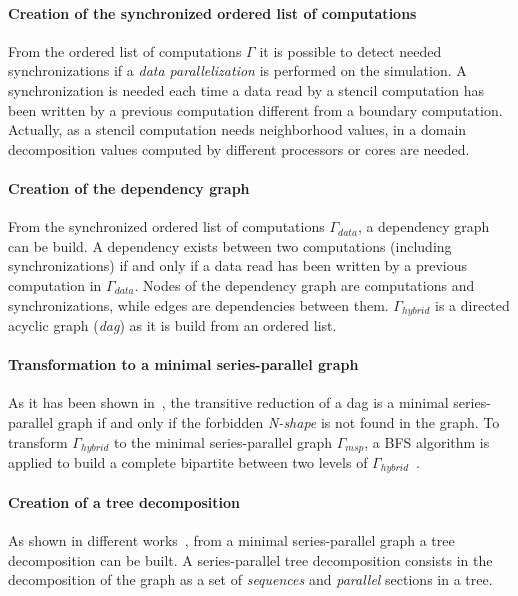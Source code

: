 \paragraph{Creation of the synchronized ordered list of computations} From the ordered list of computations $\Gamma$ it is possible to detect needed synchronizations if a \emph{data parallelization} is performed on the simulation. A synchronization is needed each time a data read by a stencil computation has been written by a previous computation different from a boundary computation. Actually, as a stencil computation needs neighborhood values, in a domain decomposition values computed by different processors or cores are needed.

\paragraph{Creation of the dependency graph} From the synchronized ordered list of computations $\Gamma_{data}$, a dependency graph can be build. A dependency exists between two computations (including synchronizations) if and only if a data read has been written by a previous computation in $\Gamma_{data}$. Nodes of the dependency graph are computations and synchronizations, while edges are dependencies between them. $\Gamma_{hybrid}$ is a directed acyclic graph (\emph{dag}) as it is build from an ordered list.

\paragraph{Transformation to a minimal series-parallel graph} As it has been shown in~\cite{Valdes:1979:RSP:800135.804393}, the transitive reduction of a dag is a minimal series-parallel graph if and only if the forbidden \emph{N-shape} is not found in the graph. To transform $\Gamma_{hybrid}$ to the minimal series-parallel graph $\Gamma_{msp}$, a BFS algorithm is applied to build a complete bipartite between two levels of $\Gamma_{hybrid}$~\cite{Mitchell:2004:CMV:1082101.1082117}.

\paragraph{Creation of a tree decomposition} As shown in different works~\cite{Valdes:1979:RSP:800135.804393,Schoenmakers95anew}, from a minimal series-parallel graph a tree decomposition can be built. A series-parallel tree decomposition consists in the decomposition of the graph as a set of \emph{sequences} and \emph{parallel} sections in a tree. 

